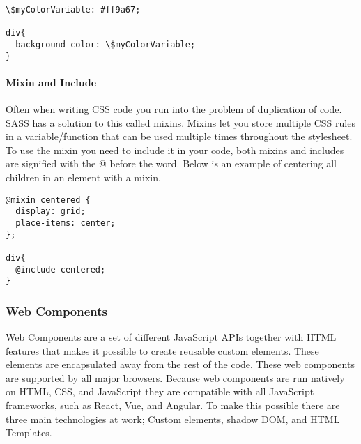\begin{lstlisting}[style=htmlcssjs]
\$myColorVariable: #ff9a67; 

div{
  background-color: \$myColorVariable;
}
\end{lstlisting}


\paragraph{Mixin and Include}
Often when writing CSS code you run into the problem of duplication of code. SASS has a solution to this called mixins. Mixins let you store multiple CSS rules in a variable/function that can be used multiple times throughout the stylesheet. To use the mixin you need to include it in your code, both mixins and includes are signified with the @ before the word. Below is an example of centering all children in an element with a mixin.

\begin{lstlisting}[style=htmlcssjs]
@mixin centered {
  display: grid;
  place-items: center;
}; 

div{
  @include centered; 
}
\end{lstlisting}








\subsubsection{Web Components}%
\label{sub:Web Components}
Web Components are a set of different JavaScript APIs together with HTML features that makes it possible to create reusable custom elements\cite{WebComponentsMDN}. These elements are encapsulated away from the rest of the code. These web components are supported by all major browsers. Because web components are run natively on HTML, CSS, and JavaScript they are compatible with all JavaScript frameworks, such as React, Vue, and Angular. To make this possible there are three main technologies at work; Custom elements, shadow DOM, and HTML Templates.

